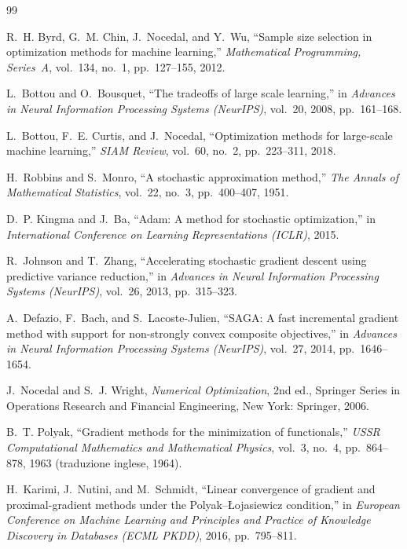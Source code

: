 \begin{thebibliography}{99}

R.~H. Byrd, G.~M. Chin, J.~Nocedal, and Y.~Wu,
``Sample size selection in optimization methods for machine learning,''
\textit{Mathematical Programming, Series~A}, vol.~134, no.~1, pp.~127--155,
2012.

L.~Bottou and O.~Bousquet,
``The tradeoffs of large scale learning,''
in \textit{Advances in Neural Information Processing Systems (NeurIPS)},
vol.~20, 2008, pp.~161--168.

L.~Bottou, F.~E. Curtis, and J.~Nocedal,
``Optimization methods for large-scale machine learning,''
\textit{SIAM Review}, vol.~60, no.~2, pp.~223--311, 2018.

H.~Robbins and S.~Monro,
``A stochastic approximation method,''
\textit{The Annals of Mathematical Statistics}, vol.~22, no.~3,
pp.~400--407, 1951.

D.~P. Kingma and J.~Ba,
``Adam: A method for stochastic optimization,''
in \textit{International Conference on Learning Representations (ICLR)},
2015.

R.~Johnson and T.~Zhang,
``Accelerating stochastic gradient descent using predictive variance
reduction,''
in \textit{Advances in Neural Information Processing Systems (NeurIPS)},
vol.~26, 2013, pp.~315--323.

A.~Defazio, F.~Bach, and S.~Lacoste-Julien,
``SAGA: A fast incremental gradient method with support for non-strongly
convex composite objectives,''
in \textit{Advances in Neural Information Processing Systems (NeurIPS)},
vol.~27, 2014, pp.~1646--1654.

J.~Nocedal and S.~J. Wright,
\textit{Numerical Optimization}, 2nd ed.,
Springer Series in Operations Research and Financial Engineering,
New York: Springer, 2006.

B.~T. Polyak,
``Gradient methods for the minimization of functionals,''
\textit{USSR Computational Mathematics and Mathematical Physics},
vol.~3, no.~4, pp.~864--878, 1963 (traduzione inglese, 1964).

H.~Karimi, J.~Nutini, and M.~Schmidt,
``Linear convergence of gradient and proximal-gradient methods under the
Polyak--{\L}ojasiewicz condition,''
in \textit{European Conference on Machine Learning and Principles and
Practice of Knowledge Discovery in Databases (ECML PKDD)}, 2016,
pp.~795--811.


\end{thebibliography}
